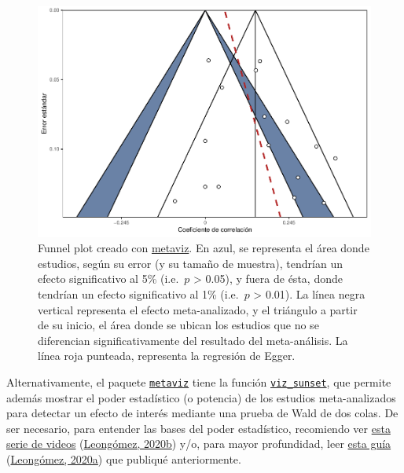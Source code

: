 \documentclass[
  bookmarksnumbered]{article}
\begin{document}
\begin{figure}
\centering
\includegraphics{Meta-analysis_files/figure-latex/funnel-plot2-1.pdf}
\caption{\label{fig:funnel-plot2}Funnel plot creado con \href{https://cran.r-project.org/web/packages/metaviz/vignettes/metaviz.html}{metaviz}. En azul, se representa el área donde estudios, según su error (y su tamaño de muestra), tendrían un efecto significativo al 5\% (i.e.~\(p\) \textgreater{} 0.05), y fuera de ésta, donde tendrían un efecto significativo al 1\% (i.e.~\(p\) \textgreater{} 0.01). La línea negra vertical representa el efecto meta-analizado, y el triángulo a partir de su inicio, el área donde se ubican los estudios que no se diferencian significativamente del resultado del meta-análisis. La línea roja punteada, representa la regresión de Egger.}
\end{figure}

Alternativamente, el paquete \href{https://cran.r-project.org/web/packages/metaviz/vignettes/metaviz.html}{\texttt{metaviz}} tiene la función \href{https://cran.r-project.org/web/packages/metaviz/vignettes/metaviz.html\#sunset-power-enhanced-funnel-plots}{\texttt{viz\_sunset}}, que permite además mostrar el poder estadístico (o potencia) de los estudios meta-analizados para detectar un efecto de interés mediante una prueba de Wald de dos colas. De ser necesario, para entender las bases del poder estadístico, recomiendo ver \href{https://youtube.com/playlist?list=PLHk7UNt35ccVdyHqnQ6oXVYA6JBNFrE1x}{esta serie de videos} (\protect\hyperlink{ref-leongomezPoderRvid2020}{Leongómez, 2020b}) y/o, para mayor profundidad, leer \href{https://doi.org/10.5281/zenodo.3988776}{esta guía} (\protect\hyperlink{ref-leongomezAnalisisPoderEstadistico2020}{Leongómez, 2020a}) que publiqué anteriormente.
\end{document}
